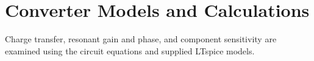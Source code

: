 \chapter{Converter Models and Calculations}
\label{ch:simulation}

Charge transfer, resonant gain and phase, and component sensitivity are examined using the circuit equations and supplied LTspice models.











